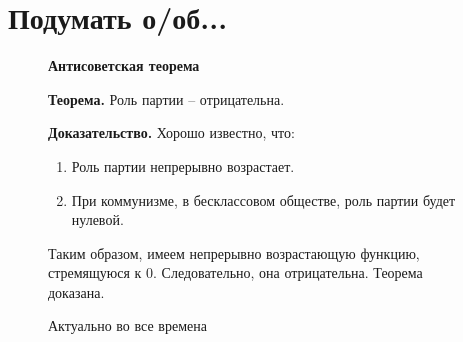 \section{Подумать о/об...}
\begin{figure}[ht!]
    \large
    \begin{center}
        \textbf{Антисоветская теорема}
    \end{center}
    \textbf{Теорема.} Роль партии -- отрицательна.

    \textbf{Доказательство.} Хорошо известно, что:
    \begin{enumerate}
        \item Роль партии непрерывно возрастает.
        \item При коммунизме, в бесклассовом обществе, роль партии будет нулевой.
    \end{enumerate}
    Таким образом, имеем непрерывно возрастающую функцию, стремящуюся к 0. Следовательно, она отрицательна. Теорема доказана.
    \caption{Актуально во все времена}
\end{figure}
